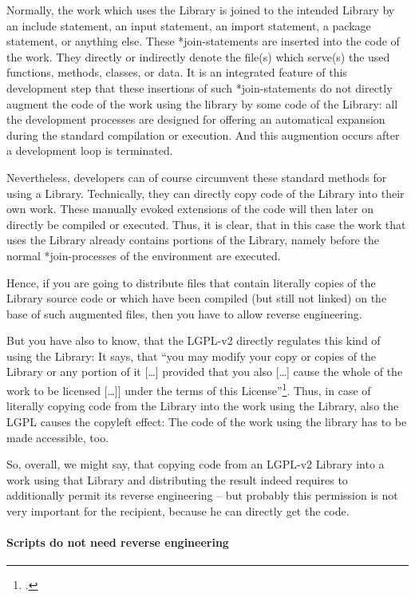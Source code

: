 Normally, the work which uses the Library is joined to the intended Library by
an include statement, an input statement, an import statement, a package
statement, or anything else. These *join-statements are inserted into the code
of the work. They directly or indirectly denote the file(s) which serve(s) the
used functions, methods, classes, or data. It is an integrated feature of this
development step that these insertions of such *join-statements do not directly
augment the code of the work using the library by some code of the Library: all
the development processes are designed for offering an automatical expansion
during the standard compilation or execution. And this augmention occurs after a
development loop is terminated.

Nevertheless, developers can of course circumvent these standard methods for
using a Library. Technically, they can directly copy code of the Library into
their own work. These manually evoked extensions of the code will then later
on directly be compiled or executed. Thus, it is clear, that in this case the
work that uses the Library already contains portions of the Library, namely
before the normal *join-processes of the environment are executed.

Hence, if you are going to distribute files that contain literally copies of the
Library source code or which have been compiled (but still not linked) on the
base of such augmented files, then you have to allow reverse engineering.

But you have also to know, that the LGPL-v2 directly regulates this kind of
using the Library: It says, that \enquote{you may modify your copy or copies of
the Library or any portion of it [\ldots] provided that you also [\ldots] cause
the whole of the work to be licensed [\ldots]] under the terms of this
License}\footcite[cf.][\nopage wp.,§2, escpcially §2c]{Lgpl21OsiLicense1999a}.
Thus, in case of literally copying code from the Library into the work using the
Library, also the LGPL causes the copyleft effect: The code of the work using
the library has to be made accessible, too. 

So, overall, we might say, that copying code from an LGPL-v2 Library into a work
using that Library and distributing the result indeed requires to additionally
permit its reverse engineering -- but probably this permission is not very
important for the recipient, because he can directly get the code.

\paragraph{Scripts do not need reverse engineering}

